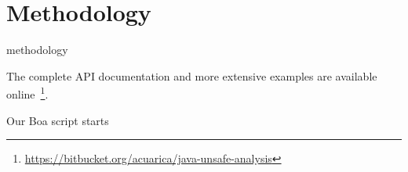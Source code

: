 
\section{Methodology} \label{sec:methodology}

methodology

The complete API documentation and more extensive examples are available online~\footnote{\url{https://bitbucket.org/acuarica/java-unsafe-analysis}}.

Our Boa script starts 